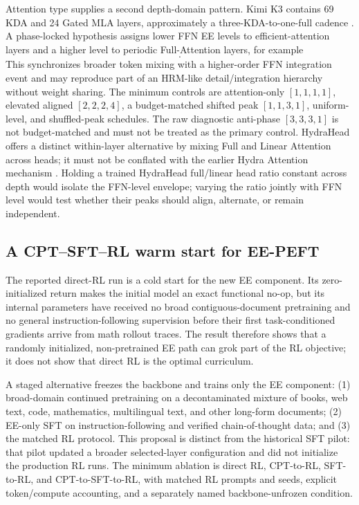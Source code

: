 \documentclass[10pt]{article}
\begin{document}
Attention type supplies a second depth-domain pattern.  Kimi K3 contains 69
KDA and 24 Gated MLA layers, approximately a three-KDA-to-one-full cadence
\citep{kimit2026k3}.  A phase-locked hypothesis assigns lower FFN EE levels to
efficient-attention layers and a higher level to periodic Full-Attention
layers, for example
\begin{equation}
 [\mathrm{KDA}_1,\mathrm{KDA}_1,\mathrm{KDA}_1,\mathrm{Full}_3].
\end{equation}
This synchronizes broader token mixing with a higher-order FFN integration
event and may reproduce part of an HRM-like detail/integration hierarchy
without weight sharing.  The minimum controls are attention-only
$[1,1,1,1]$, elevated aligned $[2,2,2,4]$, a budget-matched shifted peak
$[1,1,3,1]$, uniform-level, and shuffled-peak schedules.  The raw diagnostic
anti-phase $[3,3,3,1]$ is not budget-matched and must not be treated as the
primary control.  HydraHead offers a distinct within-layer alternative by
mixing Full and Linear Attention across heads; it must not be conflated with
the earlier Hydra Attention mechanism \citep{tan2026hydrahead,bolya2022hydra}.
Holding a trained HydraHead full/linear head ratio constant across depth would
isolate the FFN-level envelope; varying the ratio jointly with FFN level would
test whether their peaks should align, alternate, or remain independent.

\subsection{A CPT--SFT--RL warm start for EE-PEFT}

The reported direct-RL run is a cold start for the new EE component.  Its
zero-initialized return makes the initial model an exact functional no-op, but
its internal parameters have received no broad contiguous-document pretraining
and no general instruction-following supervision before their first
task-conditioned gradients arrive from math rollout traces.  The result
therefore shows that a randomly initialized, non-pretrained EE path can grok
part of the RL objective; it does not show that direct RL is the optimal
curriculum.

A staged alternative freezes the backbone and trains only the EE component:
(1) broad-domain continued pretraining on a decontaminated mixture of books,
web text, code, mathematics, multilingual text, and other long-form documents;
(2) EE-only SFT on instruction-following and verified chain-of-thought data;
and (3) the matched RL protocol.  This proposal is distinct from the historical
SFT pilot: that pilot updated a broader selected-layer configuration and did
not initialize the production RL runs.  The minimum ablation is direct RL,
CPT-to-RL, SFT-to-RL, and CPT-to-SFT-to-RL, with matched RL prompts and seeds,
explicit token/compute accounting, and a separately named backbone-unfrozen
condition.
\end{document}
